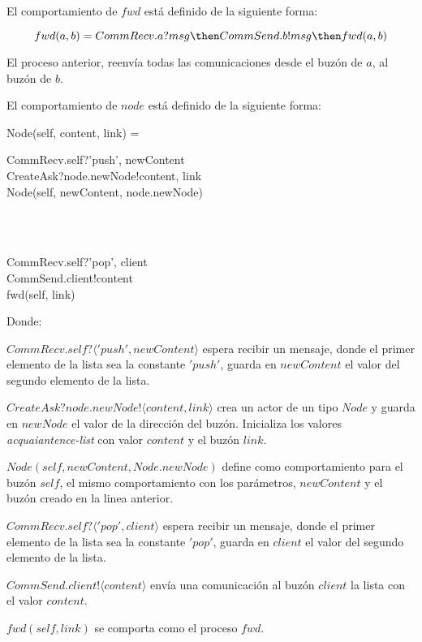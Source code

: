 El comportamiento de $fwd$ está definido de la siguiente forma:

\[
  fwd(a, b) = CommRecv.a?msg \then CommSend.b!msg \then fwd(a, b)
\]

El proceso anterior, reenvía todas las comunicaciones desde el buzón de $a$, al buzón de $b$.

El comportamiento de $node$ está definido de la siguiente forma:

\begin{process}
Node(self, content, link) = {} \\ \quad
\begin{block}
CommRecv.self?\langle 'push', newContent \rangle \then \\
CreateAsk?node.newNode!\langle content, link \rangle \then \\
Node(self, newContent, node.newNode)
\end{block} \\
\Extchoice \\ \quad
\begin{block}
CommRecv.self?\langle 'pop', client \rangle \then  \\
CommSend.client!\langle content \rangle \then  \\
fwd(self, link)
\end{block}

\end{process}

Donde:

\begin{description}
 \item $CommRecv.self?\langle 'push', newContent \rangle$ espera recibir un mensaje, donde el primer elemento de la lista sea la constante $'push'$, guarda en $newContent$ el valor del segundo elemento de la lista.
 \item $CreateAsk?node.newNode!\langle content, link \rangle$ crea un actor de un tipo $Node$ y guarda en $newNode$ el valor de la dirección del buzón. Inicializa los valores \textit{acquaiantence-list} con valor $content$ y el buzón $link$.
 \item $Node(self, newContent, Node.newNode)$ define como comportamiento para el buzón $self$, el mismo comportamiento con los parámetros, $newContent$ y el buzón creado en la linea anterior.
 \item $CommRecv.self?\langle 'pop', client \rangle$ espera recibir un mensaje, donde el primer elemento de la lista sea la constante $'pop'$, guarda en $client$ el valor del segundo elemento de la lista.
 \item $CommSend.client!\langle content \rangle$ envía una comunicación al buzón $client$ la lista con el valor $content$.
 \item $fwd(self, link)$ se comporta como el proceso $fwd$.
\end{description}

